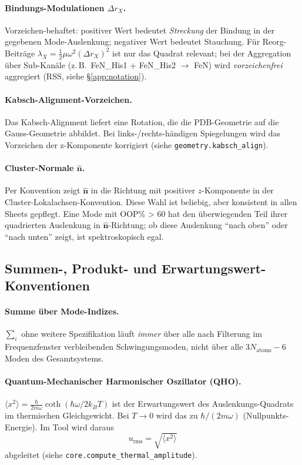 \documentclass[11pt,a4paper,twoside]{article}
\theoremstyle{remark}
\begin{document}
\paragraph{Bindungs-Modulationen $\Delta r_X$.}
Vorzeichen-behaftet: positiver Wert bedeutet \emph{Streckung} der
Bindung in der gegebenen Mode-Auslenkung; negativer Wert bedeutet
Stauchung. F\"ur Reorg-Beitr\"age $\lambda_X = \tfrac{1}{2}\mu\omega^2
(\Delta r_X)^2$ ist nur das Quadrat relevant; bei der Aggregation
\"uber Sub-Kan\"ale (z.\,B.\ FeN\_His1 + FeN\_His2 $\to$ FeN) wird
\emph{vorzeichenfrei} aggregiert (RSS, siehe \S\ref{app:notation}).

\paragraph{Kabsch-Alignment-Vorzeichen.}
Das Kabsch-Alignment liefert eine Rotation, die die PDB-Geometrie
auf die Gauss-Geometrie abbildet. Bei links-/rechts-h\"andigen
Spiegelungen wird das Vorzeichen der z-Komponente korrigiert
(siehe \texttt{geometry.kabsch\_align}).

\paragraph{Cluster-Normale $\hat{\mathbf{n}}$.}
Per Konvention zeigt $\hat{\mathbf{n}}$ in die Richtung mit positiver
$z$-Komponente in der Cluster-Lokalachsen-Konvention. Diese
Wahl ist beliebig, aber konsistent in allen Sheets gepflegt.
Eine Mode mit OOP\% > 60 hat den \"uberwiegenden Teil ihrer
quadrierten Auslenkung in $\hat{\mathbf{n}}$-Richtung; ob diese
Auslenkung "`nach oben"' oder "`nach unten"' zeigt, ist
spektroskopisch egal.

\subsection{Summen-, Produkt- und Erwartungswert-Konventionen}

\paragraph{Summe \"uber Mode-Indizes.}
$\sum_i$ ohne weitere Spezifikation l\"auft \emph{immer} \"uber alle
nach Filterung im Frequenzfenster verbleibenden Schwingungsmoden,
nicht \"uber alle $3N_\text{atoms} - 6$ Moden des
Gesamtsystems.

\paragraph{Quantum-Mechanischer Harmonischer Oszillator (QHO).}
$\langle x^2 \rangle = \frac{\hbar}{2 m \omega}\coth(\hbar\omega/2k_BT)$
ist der Erwartungswert des Auslenkungs-Quadrats im thermischen
Gleichgewicht. Bei $T \to 0$ wird das zu $\hbar/(2m\omega)$
(Nullpunkts-Energie). Im Tool wird daraus
\begin{equation}
  u_\text{rms} = \sqrt{\langle x^2\rangle}
\end{equation}
abgeleitet (siehe \texttt{core.compute\_thermal\_amplitude}).
\end{document}
